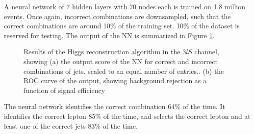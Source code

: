 

A neural network of 7 hidden layers with 70 nodes each is trained on 1.8 million events. Once again, incorrect combinations are downsampled, such that the correct combinations are around 10\% of the training set. 10\% of the dataset is reserved for testing. The output of the NN is summarized in Figure \ref{fig:higgs3lSresults}.

\begin{figure}[H]
    \centering
  \label{fig:higgs3lSresults}
  \caption{Results of the Higgs reconstruction algorithm in the $3lS$ channel, showing (a) the output score of the NN for correct and incorrect combinations of jets, scaled to an equal number of entries,. (b) the ROC curve of the output, showing background rejection as a function of signal efficiency}
\end{figure} 

The neural network identifies the correct combination 64\% of the time. It identifies the correct lepton 85\% of the time, and selects the correct lepton and at least one of the correct jets 83\% of the time.

